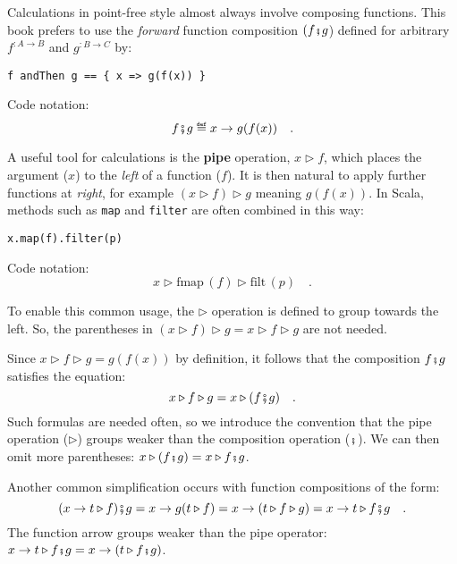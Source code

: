 Calculations in point-free style almost always involve composing functions.
This book prefers to use the \emph{forward} function composition $(f\bef g$)
defined for arbitrary $f^{:A\rightarrow B}$ and $g^{:B\rightarrow C}$
by:
\begin{lstlisting}
f andThen g == { x => g(f(x)) }
\end{lstlisting}
Code notation:
\[
f\bef g\triangleq x\rightarrow g(f(x))\quad.
\]

A useful tool for calculations is the \textbf{pipe}
operation, $x\triangleright f$, which places the argument ($x$)
to the \emph{left} of a function ($f$). It is then natural to apply
further functions at \emph{right}, for example $(x\triangleright f)\triangleright g$
meaning $g(f(x))$. In Scala, methods such as \lstinline!map! and
\lstinline!filter! are often combined in this way:
\begin{lstlisting}
x.map(f).filter(p)
\end{lstlisting}
Code notation:
\[
x\triangleright\text{fmap}\,(f)\triangleright\text{filt}\,(p)\quad.
\]

To enable this common usage, the $\triangleright$ operation is defined
to group towards the left. So, the parentheses in $(x\triangleright f)\triangleright g=x\triangleright f\triangleright g$
are not needed.

Since $x\triangleright f\triangleright g=g(f(x))$ by definition,
it follows that the composition $f\bef g$ satisfies the equation:
\[
x\triangleright f\triangleright g=x\triangleright(f\bef g)\quad.
\]
Such formulas are needed often, so we introduce the convention that
the pipe operation ($\triangleright$) groups weaker than the composition
operation ($\bef$). We
can then omit more parentheses: $x\triangleright(f\bef g)=x\triangleright f\bef g$. 

Another common simplification occurs with function compositions of
the form:
\[
(x\rightarrow t\triangleright f)\bef g=x\rightarrow g(t\triangleright f)=x\rightarrow(t\triangleright f\triangleright g)=x\rightarrow t\triangleright f\bef g\quad.
\]
The function arrow groups weaker than the pipe operator: $x\rightarrow t\triangleright f\bef g=x\rightarrow(t\triangleright f\bef g)$.

